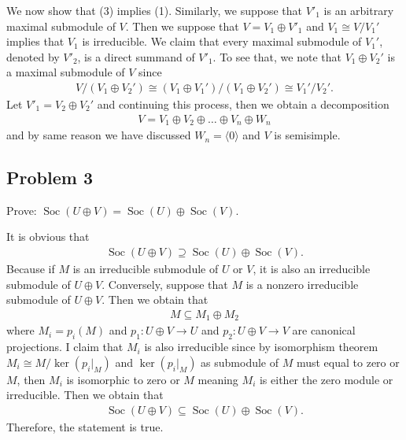 \begin{solution}
    We now show that (3) implies (1). Similarly, we suppose that $V'_1$ is an arbitrary maximal submodule of $V$.
    Then we suppose that $V=V_1\oplus V'_1$ and $V_1\cong V/V_1'$ implies that $V_1$ is irreducible.
    We claim that every maximal submodule of $V_1'$, denoted by $V'_2$, is a direct summand of $V'_1$. To see that, we note that $V_1\oplus V_2'$ is a maximal submodule of $V$ since 
    \begin{align*}
        V/(V_1\oplus V_2')\cong (V_1\oplus V_1')/(V_1\oplus V_2')\cong V_1'/V_2'.
    \end{align*}
    Let $V'_1= V_2\oplus V_2'$ and continuing this process, then we obtain a decomposition
    \begin{align*}
         V = V_1\oplus V_2\oplus \dots \oplus V_n \oplus W_n
    \end{align*}
    and by same reason we have discussed $W_n=\langle 0 \rangle$ and $V$ is semisimple.
\end{solution}



\subsection*{Problem 3}
Prove: $\operatorname{Soc}(U \oplus V) = \operatorname{Soc}(U) \oplus \operatorname{Soc}(V)$.
\begin{solution}
    It is obvious that
    \begin{align*}
        \operatorname{Soc}(U \oplus V) \supseteq \operatorname{Soc}(U) \oplus \operatorname{Soc}(V).
    \end{align*}
    Because if $M$ is an irreducible submodule of $U$ or $V$, it is also an irreducible submodule of $U\oplus V$.
    Conversely, suppose that $M$ is a nonzero irreducible submodule of $U\oplus V$. 
    Then we obtain that 
    \begin{align*}
        M\subseteq M_1 \oplus M_2
    \end{align*}
    where $M_i=p_i(M)$ and $p_1:U \oplus V\to U$ and $p_2:U \oplus V\to V$ are canonical projections. 
    I claim that $M_i$ is also irreducible since by isomorphism theorem $M_i\cong M/\ker(p_i|_{M})$ and $\ker(p_i|_{M})$ as submodule of $M$ must
    equal to zero or $M$, then $M_i$ is isomorphic to zero or $M$ meaning $M_i$ is either the zero module or irreducible.
    Then we obtain that
    \begin{align*}
        \operatorname{Soc}(U \oplus V) \subseteq \operatorname{Soc}(U) \oplus \operatorname{Soc}(V).
    \end{align*}
    Therefore, the statement is true.
\end{solution}


